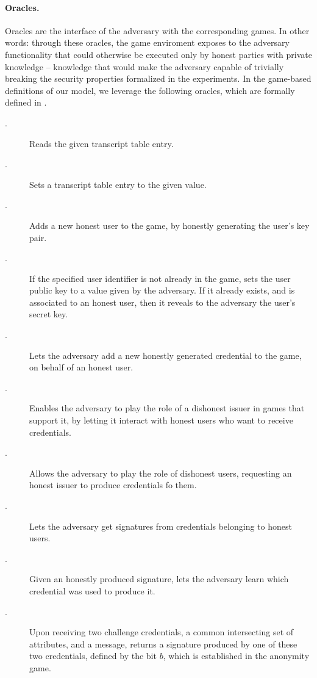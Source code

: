 \paragraph{Oracles.} %
Oracles are the interface of the adversary with the corresponding games. In
other words: through these oracles, the game enviroment exposes to the adversary
functionality that could otherwise be executed only by honest parties with
private knowledge -- knowledge that would make the adversary capable of
trivially breaking the security properties formalized in the experiments.
In the game-based definitions of our \GSAC model, we leverage the following
oracles, which are formally defined in .

\begin{description}
\item[\RREG.] Reads the given transcript table entry.
\item[\WREG.] Sets a transcript table entry to the given value.
\item[\HUGEN.] Adds a new honest user to the game, by honestly generating
  the user's key pair.
\item[\CUGEN.] If the specified user identifier is not already in the game,
  sets the user public key to a value given by the adversary. If it already
  exists, and is associated to an honest user, then it reveals to the adversary
  the user's secret key.
\item[\OBTISS.] Lets the adversary add a new honestly generated credential to
  the game, on behalf of an honest user.
\item[\OBTAIN.] Enables the adversary to play the role of a dishonest issuer
  in games that support it, by letting it interact with honest users who want to
  receive credentials.
\item[\ISSUE.] Allows the adversary to play the role of dishonest users,
  requesting an honest issuer to produce credentials fo them.
\item[\SIGN.] Lets the adversary get signatures from credentials belonging
  to honest users.
\item[\OPEN.] Given an honestly produced signature, lets the adversary learn
  which credential was used to produce it.
\item[\CHALb.] Upon receiving two challenge credentials, a common intersecting
  set of attributes, and a message, returns a signature produced by one of these
  two credentials, defined by the bit $b$, which is established in the anonymity
  game.
\end{description}

